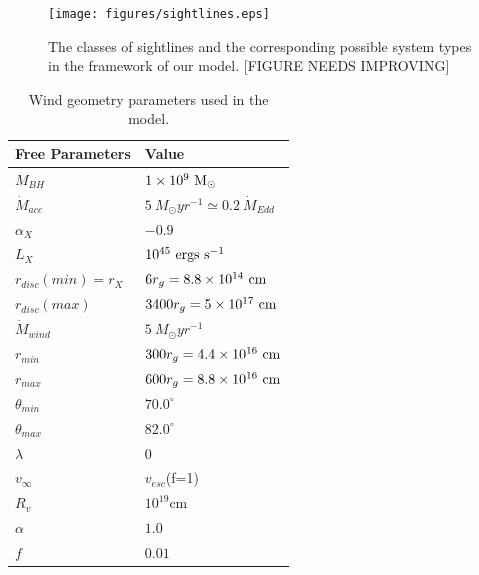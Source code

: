 \documentclass[useAMS,usenatbib]{mn2e_x}
\begin{document}
\begin{figure}
\centering
\texttt{[image: figures/sightlines.eps]}
\caption
{
The classes of sightlines and the corresponding possible 
system types in the framework of our model.
[FIGURE NEEDS IMPROVING]
}
\label{fig:lobal}
\end{figure}




\begin{table}
\begin{tabular}{p{3cm}p{4cm}}
\hline Free Parameters 	&	 Value \\ 
\hline \hline 
$M_{BH}$ 	 &	 $1\times 10^9~\rm{M_{\odot}}$ \\ 
$\dot{M}_{acc}$ 	 &	 $5~M_{\odot}yr^{-1} \simeq 0.2~\dot{M}_{Edd}$\\ 
$\alpha_X$ 	 &	 $-0.9$ \\ 
$L_{X} $ 	 &	 $10^{45}~\rm{ergs~s^{-1}}$\\ 
$r_{disc}(min)=r_{X}$   &	 $6r_g=8.8\times10^{14}~{\rm cm}$ \\ 
$r_{disc}(max)$   &	 $3400r_g = 5\times10^{17}~{\rm cm}$ \\ 
$\dot{M}_{wind}$  &	 $5~M_{\odot}yr^{-1}$ \\ 
$r_{min}$ 	&	 $300r_{g} = 4.4\times10^{16}~{\rm cm}$\\ 
$r_{max}$ 	&	 $600r_{g} = 8.8\times10^{16}~{\rm cm}$ \\ 
$\theta_{min}$ 	&	 $70.0^{\circ}$ \\ 
$\theta_{max}$ 	&	 $82.0^{\circ}$ \\ 
$\lambda$ 	&	 $0$ \\ 
$v_{\infty}$ 	&	 $v_{esc}$(f=1) \\ 
$R_v$ 	        &	 $10^{19}$cm \\ 
$\alpha$ 	&	 $1.0$ \\
$f$ 	&	 $0.01$ \\
\hline 
\end{tabular}
\caption{Wind geometry parameters used in the model.}
\label{wind_param}
\end{table}
\end{document}
